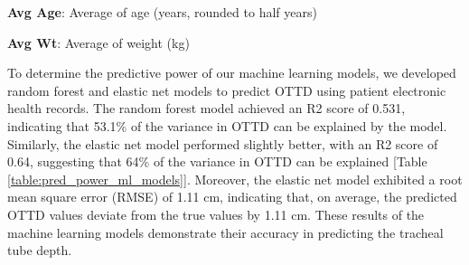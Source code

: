 \documentclass[11pt]{article}
\begin{document}
\begin{table}[h]
\caption{Descriptive statistics of patient ages and weights stratified by their sex}
\label{table:desc_stats_age_weight_by_sex}
\begin{threeparttable}
\renewcommand{\TPTminimum}{\linewidth}
\begin{tablenotes}
\footnotesize
\item \textbf{Avg Age}: Average of age (years, rounded to half years)
\item \textbf{Avg Wt}: Average of weight (kg)
\end{tablenotes}
\end{threeparttable}
\end{table}


To determine the predictive power of our machine learning models, we developed random forest and elastic net models to predict OTTD using patient electronic health records. The random forest model achieved an R2 score of 0.531, indicating that 53.1\% of the variance in OTTD can be explained by the model. Similarly, the elastic net model performed slightly better, with an R2 score of 0.64, suggesting that 64\% of the variance in OTTD can be explained [Table {}\ref{table:pred_power_ml_models}]. Moreover, the elastic net model exhibited a root mean square error (RMSE) of 1.11 cm, indicating that, on average, the predicted OTTD values deviate from the true values by 1.11 cm. These results of the machine learning models demonstrate their accuracy in predicting the tracheal tube depth.
\end{document}
